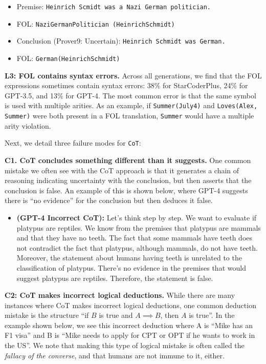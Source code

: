 \documentclass[11pt]{article}
\begin{document}
\begin{itemize}[leftmargin=*]
\itemsep0.1em
    \item[] \small Premise: \texttt{Heinrich Scmidt was a Nazi German politician.}
    \item[] \small FOL: \texttt{NaziGermanPolitician (HeinrichSchmidt)}
    \item[] \small Conclusion (Prover9: Uncertain): \texttt{Heinrich Schmidt was German.}
    \item[] \small FOL: \texttt{German(HeinrichSchmidt)}
\end{itemize}

\textbf{L3: FOL contains syntax errors.}  Across all generations, we find that the FOL expressions sometimes contain syntax errors: 38\% for StarCoderPlus, 24\% for GPT-3.5, and 13\% for GPT-4. The most common error is that the same symbol is used with multiple arities. As an example, if \texttt{Summer(July4)} and \texttt{Loves(Alex, Summer)} were both present in a FOL translation, \texttt{Summer} would have a multiple arity violation.

Next, we detail three failure modes for \texttt{CoT}:

\textbf{C1. CoT concludes something different than it suggests.} One common mistake we often see with the CoT approach is that it generates a chain of reasoning indicating uncertainty with the conclusion, but then asserts that the conclusion is false. An example of this is shown below, where GPT-4 suggests there is ``no evidence'' for the conclusion but then deduces it false.

\begin{itemize}[leftmargin=*]
\itemsep0.1em
    \item[] \small \textbf{(GPT-4 Incorrect CoT):} Let's think step by step. We want to evaluate if platypus are reptiles. We know from the premises that platypus are mammals and that they have no teeth. The fact that some mammals have teeth does not contradict the fact that platypus, although mammals, do not have teeth. Moreover, the statement about humans having teeth is unrelated to the classification of platypus. There's no evidence in the premises that would suggest platypus are reptiles. Therefore, the statement is false.
\end{itemize}

\textbf{C2: CoT makes incorrect logical deductions.} While there are many instances where CoT makes incorrect logical deductions, one common deduction mistake is the structure ``if $B$ is true and $A \implies B$, then $A$ is true''. In the example shown below, we see this incorrect deduction where A is ``Mike has an F1 visa'' and B is ``Mike needs to apply for CPT or OPT if he wants to work in the US''. We note that making this type of logical mistake is often called the \emph{fallacy of the converse}, and that humans are not immune to it, either.
\end{document}
